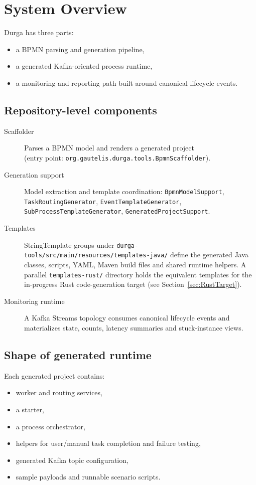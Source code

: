 \section{System Overview}
\label{sec:SystemOverview}

Durga has three parts:
\begin{itemize}
\item a BPMN parsing and generation pipeline,
\item a generated Kafka-oriented process runtime,
\item a monitoring and reporting path built around canonical lifecycle events.
\end{itemize}

\subsection{Repository-level components}

\begin{description}
\item[Scaffolder] Parses a BPMN model and renders a generated project \\ (entry point:
\texttt{org.gautelis.durga.tools.BpmnScaffolder}).
\item[Generation support] Model extraction and template coordination: \texttt{BpmnModelSupport}, \\
\texttt{TaskRoutingGenerator}, \texttt{EventTemplateGenerator},
\texttt{SubProcessTemplateGenerator}, \texttt{GeneratedProjectSupport}.
\item[Templates] StringTemplate groups under \texttt{durga-tools/src/main/resources/templates-java/}
define the generated Java classes, scripts, YAML, Maven build files and shared runtime
helpers. A parallel \texttt{templates-rust/} directory holds the equivalent templates for
the in-progress Rust code-generation target (see Section~\ref{sec:RustTarget}).
\item[Monitoring runtime] A Kafka Streams topology consumes canonical lifecycle events and
materializes state, counts, latency summaries and stuck-instance views.
\end{description}

\subsection{Shape of generated runtime}

Each generated project contains:
\begin{itemize}
\item worker and routing services,
\item a starter,
\item a process orchestrator,
\item helpers for user/manual task completion and failure testing,
\item generated Kafka topic configuration,
\item sample payloads and runnable scenario scripts.
\end{itemize}

